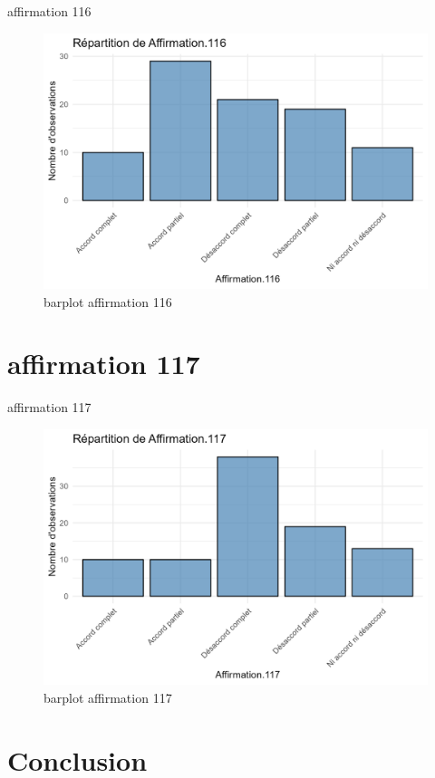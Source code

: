 \documentclass[
]{article}
\begin{document}
affirmation 116

\begin{figure}
\centering
\includegraphics{Image/barplot_Affirmation.116.png}
\caption{barplot affirmation 116}
\end{figure}

\section{affirmation 117}\label{affirmation-117}

affirmation 117

\begin{figure}
\centering
\includegraphics{Image/barplot_Affirmation.117.png}
\caption{barplot affirmation 117}
\end{figure}

\section{Conclusion}\label{conclusion}
\end{document}
